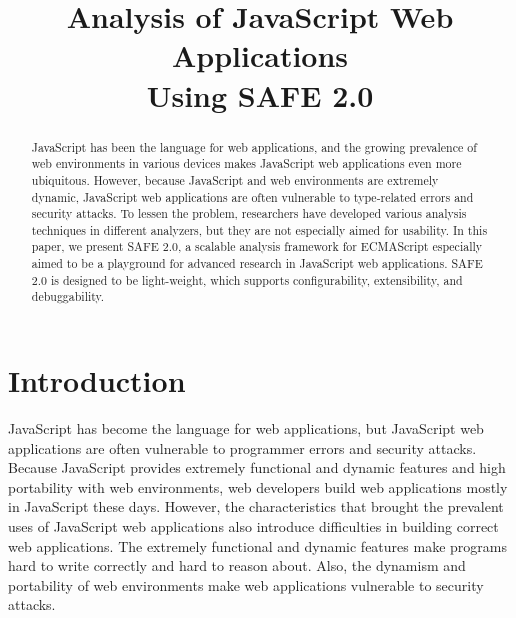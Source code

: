 \documentclass[10pt, conference]{IEEEtran}
\newcommand{\safe}{{SAFE 2.0}\xspace}
\begin{document}
\title{\hspace*{-.7em}
Analysis of JavaScript Web Applications\\ Using \safe}

\author{
\and
{}
\and
{}
\and
{}
}
\maketitle


\begin{abstract}
JavaScript has been the language for web applications, and
the growing prevalence of web environments in various devices
makes JavaScript web applications even more ubiquitous.
However, because JavaScript and web environments are
extremely dynamic, JavaScript web applications are often
vulnerable to type-related errors and security attacks.
To lessen the problem, researchers have developed various analysis
techniques in different analyzers, but they are not especially
aimed for usability.  In this paper, we present \safe, a scalable
analysis framework for ECMAScript especially aimed to be a playground
for advanced research in JavaScript web applications.  \safe is designed
to be light-weight, which supports configurability, extensibility, and
debuggability.
\end{abstract}


\section{Introduction}
JavaScript has become the language for web applications, but
JavaScript web applications are often vulnerable to programmer
errors and security attacks.  Because JavaScript provides
extremely functional and dynamic features and high portability
with web environments, web developers build web applications
mostly in JavaScript these days.  However, the characteristics
that brought the prevalent uses of JavaScript web applications
also introduce difficulties in building correct web applications.
The extremely functional and dynamic features make programs
hard to write correctly and hard to reason about.
Also, the dynamism and portability of web environments make
web applications vulnerable to security attacks.
\end{document}
